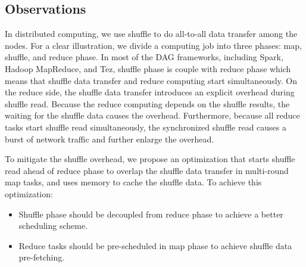 {\color{blue}
\subsection{Observations}\label{observation}

In distributed computing, we use shuffle to do all-to-all data transfer among the nodes.
For a clear illustration, we divide a computing job into three phases: map, shuffle, and reduce phase.
In most of the DAG frameworks, including Spark, Hadoop MapReduce, and Tez, shuffle phase is couple with reduce phase which means that shuffle data transfer and reduce computing start simultaneously.
On the reduce side, the shuffle data transfer introduces an explicit overhead during shuffle read.
Because the reduce computing depends on the shuffle results, the waiting for the shuffle data causes the overhead.
Furthermore, because all reduce tasks start shuffle read simultaneously, the synchronized shuffle read causes a burst of network traffic and further enlarge the overhead.

To mitigate the shuffle overhead, we propose an optimization that starts shuffle read ahead of reduce phase to overlap the shuffle data transfer in multi-round map tasks, and uses memory to cache the shuffle data. To achieve this optimization:
\begin{itemize}
	\item Shuffle phase should be decoupled from reduce phase to achieve a better scheduling scheme.
	\item Reduce tasks should be pre-scheduled in map phase to achieve shuffle data pre-fetching.
\end{itemize}
}

